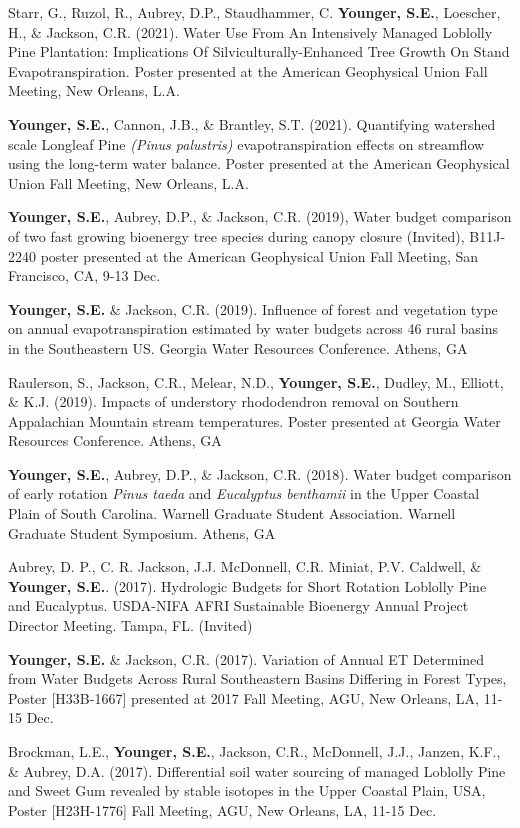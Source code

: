 \documentclass[10pt,letterpaper]{article}
\begin{document}
\begin{hangparas}{.25in}{1}
		Starr, G., Ruzol, R., Aubrey, D.P., Staudhammer, C. \textbf{Younger, S.E.}, Loescher, H., \& Jackson, C.R. (2021). Water Use From An Intensively Managed Loblolly Pine Plantation: Implications Of Silviculturally-Enhanced Tree Growth On Stand Evapotranspiration. Poster presented at the American Geophysical Union Fall Meeting, New Orleans, L.A.
		
		\textbf{Younger, S.E.}, Cannon, J.B., \& Brantley, S.T. (2021). Quantifying watershed scale Longleaf Pine \textit{(Pinus palustris)} evapotranspiration effects on streamflow using the long-term water balance. Poster presented at the American Geophysical Union Fall Meeting, New Orleans, L.A.
		
		\textbf{Younger, S.E.}, Aubrey, D.P., \& Jackson, C.R. (2019), Water budget comparison of two fast growing bioenergy tree species during canopy closure (Invited), B11J-2240 poster presented at the American Geophysical Union Fall Meeting, San Francisco, CA, 9-13 Dec.
		
		\textbf{Younger, S.E.} \& Jackson, C.R. (2019). Influence of forest and vegetation type on annual evapotranspiration estimated by water budgets across 46 rural basins in the Southeastern US. Georgia Water Resources Conference. Athens, GA
		
		Raulerson, S., Jackson, C.R., Melear, N.D., \textbf{Younger, S.E.}, Dudley, M., Elliott, \& K.J. (2019). Impacts of understory rhododendron removal on Southern Appalachian Mountain stream temperatures. Poster presented at Georgia Water Resources Conference. Athens, GA
		
		\textbf{Younger, S.E.}, Aubrey, D.P., \& Jackson, C.R. (2018). Water budget comparison of early rotation \textit{Pinus taeda} and \textit{Eucalyptus benthamii} in the Upper Coastal Plain of South Carolina. Warnell Graduate Student Association. Warnell Graduate Student Symposium. Athens, GA
		
		Aubrey, D. P., C. R. Jackson, J.J. McDonnell, C.R. Miniat, P.V. Caldwell, \& \textbf{Younger, S.E.}. (2017). Hydrologic Budgets for Short Rotation Loblolly Pine and Eucalyptus. USDA-NIFA AFRI Sustainable Bioenergy Annual Project Director Meeting. Tampa, FL. (Invited)
		
		\textbf{Younger, S.E.} \& Jackson, C.R. (2017). Variation of Annual ET Determined from Water Budgets Across Rural Southeastern Basins Differing in Forest Types, Poster [H33B-1667] presented at 2017 Fall Meeting, AGU, New Orleans, LA, 11-15 Dec.
		
		Brockman, L.E., \textbf{Younger, S.E.}, Jackson, C.R., McDonnell, J.J., Janzen, K.F., \& Aubrey, D.A. (2017). Differential soil water sourcing of managed Loblolly Pine and Sweet Gum revealed by stable isotopes in the Upper Coastal Plain, USA, Poster [H23H-1776] Fall Meeting, AGU, New Orleans, LA, 11-15 Dec.
		

\end{hangparas}
\end{document}
